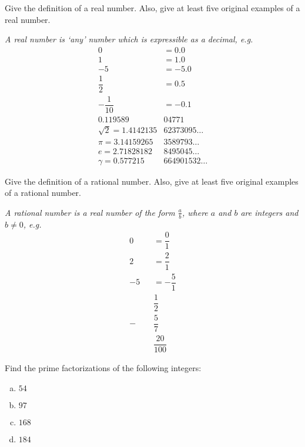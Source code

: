 \documentclass[11pt,letterpaper]{article}
\begin{document}

 Give the definition of a real number. Also, give at least five original examples of a real number. \pspace

{\itshape A real number is `any' number which is expressible as a decimal, e.g.
	\[
	\begin{aligned}
	0&= 0.0 \\[0.3cm]
	1&= 1.0 \\[0.3cm]
	-5&= -5.0 \\[0.3cm]
	\dfrac{1}{2}&= 0.5 \\[0.3cm]
	-\dfrac{1}{10}&= -0.1 \\[0.3cm]
	0.119589&04771 \\[0.3cm]
	\sqrt{2}= 1.4142135&62373095\ldots \\[0.3cm]
	\pi= 3.14159265&3589793\ldots \\[0.3cm]
	e= 2.71828182&8495045\ldots \\[0.3cm]
	\gamma= 0.577215&664901532\ldots
	\end{aligned}
	\]
}



\newpage



 Give the definition of a rational number. Also, give at least five original examples of a rational number. \pspace

{\itshape A rational number is a real number of the form $\frac{a}{b}$, where $a$ and $b$ are integers and $b \neq 0$, e.g.
	\[
	\begin{aligned}
	0&= \dfrac{0}{1} \\[0.3cm]
	2&= \dfrac{2}{1} \\[0.3cm]
	-5&= -\dfrac{5}{1} \\[0.3cm]
	\phantom{=}& \dfrac{1}{2} \\[0.3cm]
	-\phantom{=}&\dfrac{5}{7} \\[0.3cm]
	\phantom{.}&\dfrac{20}{100} 
	\end{aligned}
	\]
}



\newpage



 Find the prime factorizations of the following integers:
	\begin{enumerate}[(a)]
	\item $54$
	\item $97$
	\item $168$
	\item $184$
	\end{enumerate} \pspace
\end{document}
